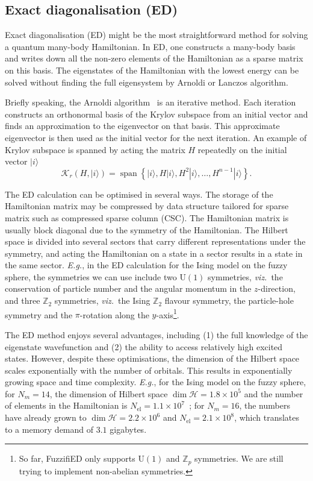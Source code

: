 \documentclass{timesjhep}
\begin{document}
\subsection{Exact diagonalisation (ED)}

Exact diagonalisation (ED) might be the most straightforward method for solving a quantum many-body Hamiltonian. In ED, one constructs a many-body basis and writes down all the non-zero elements of the Hamiltonian as a sparse matrix on this basis. The eigenstates of the Hamiltonian with the lowest energy can be solved without finding the full eigensystem by Arnoldi or Lanczos algorithm. 

Briefly speaking, the Arnoldi algorithm~\cite{Arnoldi1951} is an iterative method. Each iteration constructs an orthonormal basis of the Krylov subspace from an initial vector and finds an approximation to the eigenvector on that basis. This approximate eigenvector is then used as the initial vector for the next iteration. An example of Krylov subspace is spanned by acting the matrix $H$ repeatedly on the initial vector $|i\rangle$
\begin{equation}
    \mathcal{K}_r(H,|i\rangle)=\operatorname{span}\left\{|i\rangle,H|i\rangle,H^2|i\rangle,\dots,H^{n-1}|i\rangle\right\}.
\end{equation}

The ED calculation can be optimised in several ways. The storage of the Hamiltonian matrix may be compressed by data structure tailored for sparse matrix such as compressed sparse column (CSC). The Hamiltonian matrix is usually block diagonal due to the symmetry of the Hamiltonian. The Hilbert space is divided into several sectors that carry different representations under the symmetry, and acting the Hamiltonian on a state in a sector results in a state in the same sector. \textit{E.g.}, in the ED calculation for the Ising model on the fuzzy sphere, the symmetries we can use include two $\mathrm{U}(1)$ symmetries, \textit{viz.}~the conservation of particle number and the angular momentum in the $z$-direction, and three $\mathbb{Z}_2$ symmetries, \textit{viz.}~the Ising $\mathbb{Z}_2$ flavour symmetry, the particle-hole symmetry and the $\pi$-rotation along the $y$-axis\footnote{So far, FuzzifiED only supports $\mathrm{U}(1)$ and $\mathbb{Z}_p$ symmetries. We are still trying to implement non-abelian symmetries.}.

The ED method enjoys several advantages, including (1) the full knowledge of the eigenstate wavefunction and (2) the ability to access relatively high excited states. However, despite these optimisations, the dimension of the Hilbert space scales exponentially with the number of orbitals. This results in exponentially growing space and time complexity. \textit{E.g.}, for the Ising model on the fuzzy sphere, for $N_m=14$, the dimension of Hilbert space $\dim\mathcal{H}=1.8\times10^5$ and the number of elements in the Hamiltonian is $N_
\mathrm{el}=1.1\times 10^7$~; for $N_m=16$, the numbers have already grown to $\dim\mathcal{H}=2.2\times10^6$ and $N_\textrm{el}=2.1\times 10^8$, which translates to a memory demand of $3.1$ gigabytes. 
\end{document}
